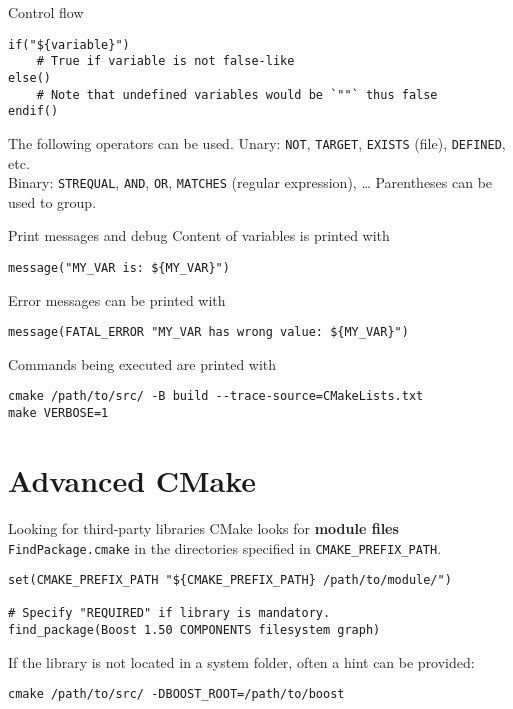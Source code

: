 \documentclass[aspectratio=169,11pt]{beamer}
\begin{document}
\begin{frame}[fragile]{Control flow}
\begin{verbatim}
if("${variable}")
    # True if variable is not false-like
else()
    # Note that undefined variables would be `""` thus false
endif()
\end{verbatim}
\vfill
The following operators can be used.
\vfill
Unary: \texttt{NOT}, \texttt{TARGET}, \texttt{EXISTS} (file), \texttt{DEFINED}, etc.\\
Binary: \texttt{STREQUAL}, \texttt{AND}, \texttt{OR}, \texttt{MATCHES} (regular expression), \dots
\vfill
Parentheses can be used to group.
\end{frame}

\begin{frame}[fragile]{Print messages and debug}
Content of variables is printed with
\begin{verbatim}
message("MY_VAR is: ${MY_VAR}")
\end{verbatim}
\vfill
Error messages can be printed with
\begin{verbatim}
message(FATAL_ERROR "MY_VAR has wrong value: ${MY_VAR}")
\end{verbatim}
\vfill
Commands being executed are printed with
\begin{verbatim}
cmake /path/to/src/ -B build --trace-source=CMakeLists.txt
make VERBOSE=1
\end{verbatim}
\end{frame}

\section{Advanced CMake}
\begin{frame}[fragile]{Looking for third-party libraries}
CMake looks for \textbf{module files} \texttt{FindPackage.cmake} in the directories specified in \texttt{CMAKE\_PREFIX\_PATH}.
\vfill
\begin{verbatim}
set(CMAKE_PREFIX_PATH "${CMAKE_PREFIX_PATH} /path/to/module/")

# Specify "REQUIRED" if library is mandatory.
find_package(Boost 1.50 COMPONENTS filesystem graph)
\end{verbatim}
\vfill
If the library is not located in a system folder, often a hint can be provided:
\begin{verbatim}
cmake /path/to/src/ -DBOOST_ROOT=/path/to/boost
\end{verbatim}
\end{frame}
\end{document}
